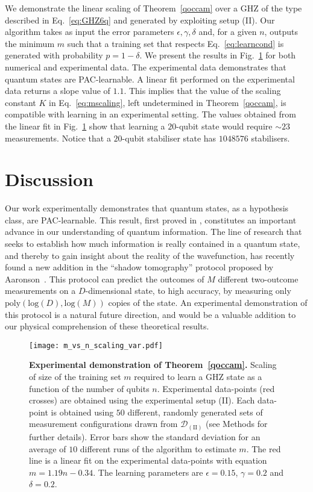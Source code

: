 \documentclass[aps,superscriptaddress,nofootinbib,twocolumn]{revtex4-1}
\begin{document}
We demonstrate the linear scaling of Theorem~\ref{qoccam} over a GHZ of the type described in Eq.~\ref{eq:GHZ6q} and generated by exploiting setup (II). Our
algorithm takes as input the error parameters $ \epsilon,
\gamma, \delta $ and, for a given $n$, outputs the minimum $m$ such that a
training set that respects Eq.~\ref{eq:learncond} is generated with probability
$p = 1 - \delta$.  We present the results in Fig.~\ref{fig:m_vs_n_final} for both numerical and experimental data. The experimental data demonstrates that quantum states are PAC-learnable. A linear fit performed on the experimental data returns a slope value of $1.1$. This implies that the value of the scaling
constant $K$ in Eq.~\ref{eq:mscaling}, left undetermined in
Theorem~\ref{qoccam}, is compatible with learning in an experimental setting. The values obtained from the linear fit in Fig.~\ref{fig:m_vs_n_final} show that learning a $20$-qubit state would require $\sim 23$ measurements. Notice that a
$20$-qubit stabiliser state has $1048576$ stabilisers.

\section*{Discussion}

Our work experimentally demonstrates that quantum states, as a hypothesis class, are PAC-learnable. This result, first proved in \cite{aaronson2007learnability}, constitutes an important advance in our understanding of quantum information. The line of research that seeks to establish how much information is
really contained in a quantum state, and thereby to gain insight about
the reality of the wavefunction, has recently found a new addition in
the ``shadow tomography'' protocol proposed by Aaronson~\cite{aaronson2017shadow}.  This protocol can predict the outcomes of $M$ different two-outcome
measurements on a $D$-dimensional state, to high accuracy, by measuring
only $\mathrm{poly}(\mathrm{log}( D), \mathrm{log}(M))$ copies of the state.
An experimental demonstration of this protocol is a natural future direction, and
would be a valuable addition to our physical comprehension of these
theoretical results.

\begin{figure}
\centering
\texttt{[image: m\_vs\_n\_scaling\_var.pdf]}
\caption{\textbf{Experimental demonstration of Theorem~\ref{qoccam}.} Scaling of size of the training set $m$ required to learn a GHZ state as a function of the number of qubits $n$. Experimental data-points (red crosses) are obtained using the experimental setup (II). Each
data-point is obtained using $50$ different, randomly
generated sets of measurement configurations drawn from $\mathcal{D}_{(\mathrm{II})}$ (see Methods for further details). Error bars show the standard deviation for an average of $10$ different runs of the algorithm to estimate $m$. The red line is a linear fit on the experimental data-points with equation $m=1.19n - 0.34$. The learning parameters are
$\epsilon = 0.15$, $\gamma = 0.2$ and $\delta = 0.2$.}
\label{fig:m_vs_n_final}
\end{figure}
\end{document}

